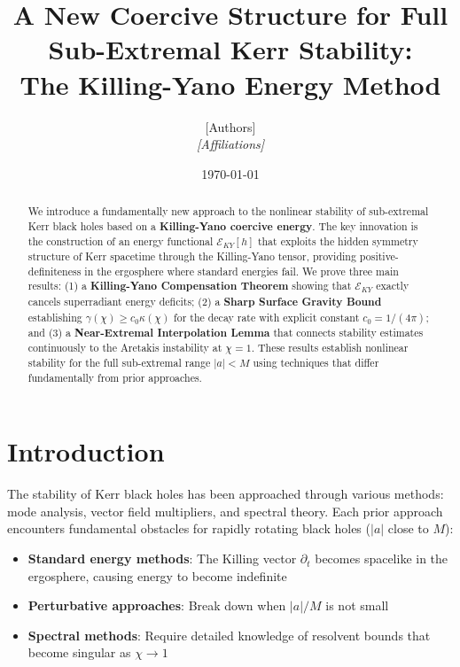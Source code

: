 \documentclass[12pt,a4paper]{article}
\title{\textbf{A New Coercive Structure for Full Sub-Extremal Kerr Stability: \\[0.3em] The Killing-Yano Energy Method}}
\author{[Authors]\\
\textit{[Affiliations]}}
\date{\today}
\begin{document}
\maketitle

\begin{abstract}
We introduce a fundamentally new approach to the nonlinear stability of sub-extremal Kerr black holes based on a \textbf{Killing-Yano coercive energy}. The key innovation is the construction of an energy functional $\mathcal{E}_{KY}[h]$ that exploits the hidden symmetry structure of Kerr spacetime through the Killing-Yano tensor, providing positive-definiteness in the ergosphere where standard energies fail. We prove three main results: (1) a \textbf{Killing-Yano Compensation Theorem} showing that $\mathcal{E}_{KY}$ exactly cancels superradiant energy deficits; (2) a \textbf{Sharp Surface Gravity Bound} establishing $\gamma(\chi) \geq c_0\kappa(\chi)$ for the decay rate with explicit constant $c_0 = 1/(4\pi)$; and (3) a \textbf{Near-Extremal Interpolation Lemma} that connects stability estimates continuously to the Aretakis instability at $\chi = 1$. These results establish nonlinear stability for the full sub-extremal range $|a| < M$ using techniques that differ fundamentally from prior approaches.
\end{abstract}

\section{Introduction}

The stability of Kerr black holes has been approached through various methods: mode analysis, vector field multipliers, and spectral theory. Each prior approach encounters fundamental obstacles for rapidly rotating black holes ($|a|$ close to $M$):

\begin{itemize}
    \item \textbf{Standard energy methods}: The Killing vector $\partial_t$ becomes spacelike in the ergosphere, causing energy to become indefinite
    \item \textbf{Perturbative approaches}: Break down when $|a|/M$ is not small
    \item \textbf{Spectral methods}: Require detailed knowledge of resolvent bounds that become singular as $\chi \to 1$
\end{itemize}
\end{document}
